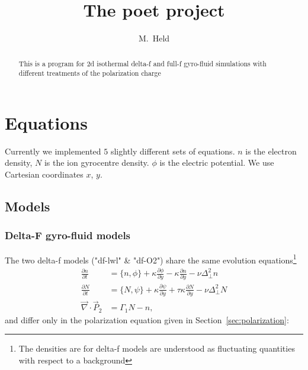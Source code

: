 

\usepackage{minted}



\title{The poet project}
\author{M.~Held}
\maketitle

\begin{abstract}
  This is a program for 2d isothermal delta-f and full-f gyro-fluid simulations with different treatments of the polarization charge
\end{abstract}

\section{Equations}
Currently we implemented $5$ slightly different sets of equations. $n$ is the electron density, $N$ is the ion gyrocentre density. $\phi$ is the electric potential. We
use Cartesian coordinates $x$, $y$.
\subsection{Models}
\subsubsection{Delta-F gyro-fluid models}
The two delta-f models ("df-lwl" \& "df-O2") share the same evolution equations\footnote{The densities are for delta-f models are understood as fluctuating quantities with respect to a background} 
\begin{subequations}
\begin{align}
 \frac{\partial n}{\partial t}     &= 
    \{ n, \phi\} 
  + \kappa \frac{\partial \phi}{\partial y} 
  -\kappa \frac{\partial n}{\partial y}
  - \nu \Delta_{\perp}^2 n  \\
  \frac{\partial N}{\partial t} &=
  \{ N, \psi\} 
  + \kappa \frac{\partial \psi}{\partial y} 
  + \tau \kappa\frac{\partial N}{\partial y} -\nu\Delta_{\perp}^2 N \\
   \vec{\nabla}\cdot \vec{P}_2 &=  \Gamma_1 N -n, 
\end{align}
\end{subequations}
and differ only in the polarization equation given in Section~\ref{sec:polarization}:
